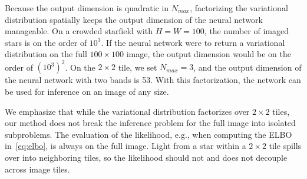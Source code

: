 
Because the output dimension is quadratic in $N_{max}$, factorizing the variational distribution spatially keeps the output dimension of the neural network manageable.
On a crowded starfield with $H = W = 100$, the number of imaged stars is on the order of $10^3$.
If the neural network were to return a variational distribution on the full $100\times 100$ image, the output dimension would be on the order of $(10^3)^2$. 
On the $2\times 2$ tile, we set $N_{max} = 3$, and the output dimension of the neural network with two bands is 53. 
With this factorization, the network can be used for inference on an image of any size. 


We emphasize that while the variational distribution factorizes over $2 \times 2$ tiles, our method does not break the inference problem for the full image into isolated subproblems. The evaluation of the likelihood, e.g., when computing the ELBO in~\eqref{eq:elbo}, is always on the full image. Light from a star within a $2 \times 2$ tile spills over into neighboring tiles, so the likelihood should not and does not decouple across image tiles. 

